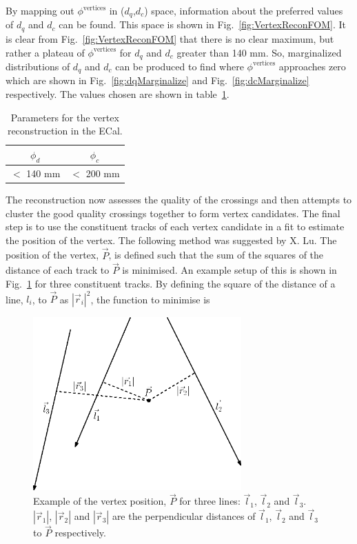 By mapping out $\phi^{\textrm{vertices}}$ in ($d_q$,$d_c$) space, information about the preferred values of $d_q$ and $d_c$ can be found.  This space is shown in Fig.~\ref{fig:VertexReconFOM}.  It is clear from Fig.~\ref{fig:VertexReconFOM} that there is no clear maximum, but rather a plateau of  $\phi^{\textrm{vertices}}$ for $d_q$ and $d_c$ greater than 140 mm.  So, marginalized distributions of $d_q$ and $d_c$ can be produced to find where $\phi^{\textrm{vertices}}$ approaches zero which are shown in Fig.~\ref{fig:dqMarginalize} and Fig.~\ref{fig:dcMarginalize} respectively.  The values chosen are shown in table~\ref{table:VertexReconParameters}. 
\begin{table}[t!]
  \begin{tabular}{ c c }
    $\phi_d$ & $\phi_c$ \\ \hline \hline
    $<$ 140 mm & $<$ 200 mm \\
  \end{tabular}
  \caption{Parameters for the vertex reconstruction in the ECal.}
  \label{table:VertexReconParameters}
\end{table}
The reconstruction now assesses the quality of the crossings and then attempts to cluster the good quality crossings together to form vertex candidates.  The final step is to use the constituent tracks of each vertex candidate in a fit to estimate the position of the vertex.  The following method was suggested by X. Lu.  The position of the vertex, $\vec{P}$, is defined such that the sum of the squares of the distance of each track to $\vec{P}$ is minimised.  An example setup of this is shown in Fig.~\ref{fig:VertexVectorDiagram} for three constituent tracks.  By defining the square of the distance of a line, $l_i$, to $\vec{P}$ as $|\vec{r}_i|^2$, the function to minimise is
\begin{figure}[!b]
  \centering
  \includegraphics[width=8cm]{images/selection/vertex_recon/vertex_vector_diagram}
  \caption{Example of the vertex position, $\vec{P}$ for three lines: $\vec{l}_1$, $\vec{l}_2$ and $\vec{l}_3$. $|\vec{r}_1|$, $|\vec{r}_2|$ and $|\vec{r}_3|$ are the perpendicular distances of $\vec{l}_1$, $\vec{l}_2$ and $\vec{l}_3$ to $\vec{P}$ respectively.}
  \label{fig:VertexVectorDiagram}
\end{figure}
